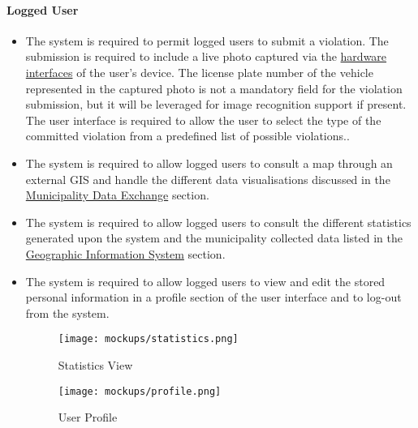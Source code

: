 \clearpage\paragraph{Logged User}
	\begin{itemize}
		\item The system is required to permit logged users to submit a violation. The submission is required to include a live photo captured via the \hyperref[sec:hardwareinterfaces]{hardware interfaces} of the user's device. The license plate number of the vehicle represented in the captured photo is not a mandatory field for the violation submission, but it will be leveraged for image recognition support if present. The user interface is required to allow the user to select the type of the committed violation from a predefined list of possible violations..			
		
		\item The system is required to allow logged users to consult a map through an external GIS and handle the different data visualisations discussed in the \hyperref[p:mde]{Municipality Data Exchange} section.
					 
			
			
		\item The system is required to allow logged users to consult the different statistics generated upon the system and the municipality collected data listed in the \hyperref[p:mde]{Geographic Information System} section.
		\item The system is required to allow logged users to view and edit the stored personal information in a profile section of the user interface and to log-out from the system. \newline\newline
			
			\begin{figure}[h]
  				\centering
  				\begin{minipage}[b]{0.4\textwidth}
    				\texttt{[image: mockups/statistics.png]}
    					\caption{Statistics View}
  				\end{minipage}
  				\hfill
  				\begin{minipage}[b]{0.4\textwidth}
    				\texttt{[image: mockups/profile.png]}
    				\caption{User Profile}
  				\end{minipage}
			\end{figure}
	\end{itemize}

\clearpage

